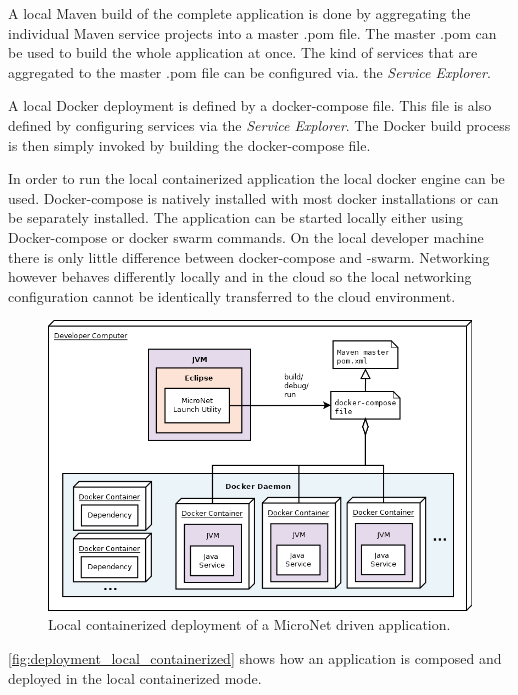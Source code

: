A local Maven build of the complete application is done by aggregating the
individual Maven service projects into a master .pom file. The master .pom can
be used to build the whole application at once. The kind of services that are
aggregated to the master .pom file can be configured via. the \textit{Service Explorer}.

A local Docker deployment is defined by a docker-compose file. This file is also
defined by configuring services via the \textit{Service Explorer}. The Docker build
process is then simply invoked by building the docker-compose file.

In order to run the local containerized application the local docker engine can
be used. Docker-compose is natively installed with most docker installations or
can be separately installed. The application can be started locally either using
Docker-compose or docker swarm commands. On the local developer machine there is
only little difference between docker-compose and -swarm. Networking however
behaves differently locally and in the cloud so the local networking
configuration cannot be identically transferred to the cloud environment.

\begin{figure}
	\centering
	\includegraphics[width=\textwidth]{images/architecture/DeploymentLocalContainerized}
	\caption{Local containerized deployment of a MicroNet driven application.}
	\label{fig:deployment_local_containerized}
\end{figure}

\autoref{fig:deployment_local_containerized} shows how an application is
composed and deployed in the local containerized mode.

